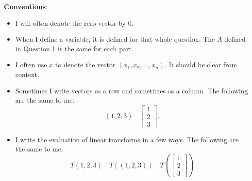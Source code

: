\documentclass[addpoints]{exam}
\begin{document}
\textbf{Conventions}:
\begin{itemize}
    \item
        I will often denote the zero vector by $0$.
    \item
        When I define a variable, it is defined for that whole question. The $A$
        defined in Question 1 is the same for each part.
    \item
        I often use $x$ to denote the vector $(x_1,x_2,\ldots,x_n)$. It should be clear from context.
    \item
        Sometimes I write vectors as a row and sometimes as a column. The
        following are the same to me.
        \[
            (1,2,3) \quad
            \begin{bmatrix}
                1 \\
                2 \\
                3
            \end{bmatrix}.
        \]
    \item
        I write the evaluation of linear transforms in a few ways. The
        following are the same to me.
        \[
            T(1,2,3) \quad T((1,2,3)) \quad T \left(
            \begin{bmatrix}
                1 \\ 2\\ 3
            \end{bmatrix}
            \right)
        \]
\end{itemize}


\newpage
\end{document}
